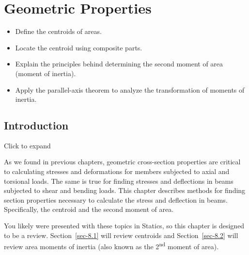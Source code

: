 \documentclass[
  letterpaper,
  DIV=11,
  numbers=noendperiod]{scrreprt}
\providecommand{\tightlist}{%
  \setlength{\itemsep}{0pt}\setlength{\parskip}{0pt}}\usepackage{longtable,booktabs,array}
\theoremstyle{definition}
\theoremstyle{remark}
\begin{document}

\chapter{Geometric Properties}\label{sec-geometric-properties}

\begin{tcolorbox}[enhanced jigsaw, left=2mm, toptitle=1mm, breakable, coltitle=black, colbacktitle=quarto-callout-note-color!10!white, opacitybacktitle=0.6, bottomrule=.15mm, titlerule=0mm, leftrule=.75mm, colframe=quarto-callout-note-color-frame, bottomtitle=1mm, opacityback=0, title={Learning Objectives}, arc=.35mm, colback=white, rightrule=.15mm, toprule=.15mm]

\begin{itemize}
\tightlist
\item
  Define the centroids of areas.
\item
  Locate the centroid using composite parts.
\item
  Explain the principles behind determining the second moment of area
  (moment of inertia).
\item
  Apply the parallel-axis theorem to analyze the transformation of
  moments of inertia.
\end{itemize}

\end{tcolorbox}

\section*{Introduction}\label{introduction-7}


Click to expand

As we found in previous chapters, geometric cross-section properties are
critical to calculating stresses and deformations for members subjected
to axial and torsional loads. The same is true for finding stresses and
deflections in beams subjected to shear and bending loads. This chapter
describes methods for finding section properties necessary to calculate
the stress and deflection in beams. Specifically, the centroid and the
second moment of area.

You likely were presented with these topics in Statics, so this chapter
is designed to be a review. Section~\ref{sec-8.1} will review centroids
and Section~\ref{sec-8.2} will review area moments of inertia (also
known as the 2\textsuperscript{nd} moment of area).
\end{document}
